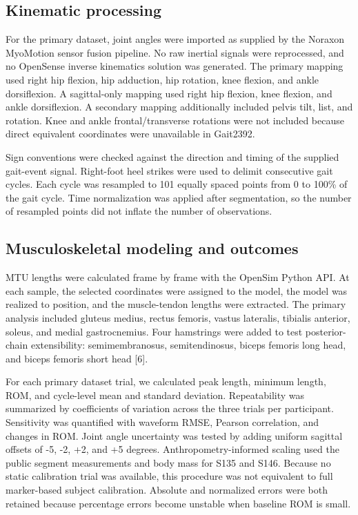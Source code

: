 \documentclass[11pt]{article}
\begin{document}
\subsection{Kinematic processing}

For the primary dataset, joint angles were imported as supplied by the Noraxon MyoMotion sensor fusion pipeline. No raw inertial signals were reprocessed, and no OpenSense inverse kinematics solution was generated. The primary mapping used right hip flexion, hip adduction, hip rotation, knee flexion, and ankle dorsiflexion. A sagittal-only mapping used right hip flexion, knee flexion, and ankle dorsiflexion. A secondary mapping additionally included pelvis tilt, list, and rotation. Knee and ankle frontal/transverse rotations were not included because direct equivalent coordinates were unavailable in Gait2392.

Sign conventions were checked against the direction and timing of the supplied gait-event signal. Right-foot heel strikes were used to delimit consecutive gait cycles. Each cycle was resampled to 101 equally spaced points from 0 to 100\% of the gait cycle. Time normalization was applied after segmentation, so the number of resampled points did not inflate the number of observations.

\subsection{Musculoskeletal modeling and outcomes}

MTU lengths were calculated frame by frame with the OpenSim Python API. At each sample, the selected coordinates were assigned to the model, the model was realized to position, and the muscle-tendon lengths were extracted. The primary analysis included gluteus medius, rectus femoris, vastus lateralis, tibialis anterior, soleus, and medial gastrocnemius. Four hamstrings were added to test posterior-chain extensibility: semimembranosus, semitendinosus, biceps femoris long head, and biceps femoris short head [6].

For each primary dataset trial, we calculated peak length, minimum length, ROM, and cycle-level mean and standard deviation. Repeatability was summarized by coefficients of variation across the three trials per participant. Sensitivity was quantified with waveform RMSE, Pearson correlation, and changes in ROM. Joint angle uncertainty was tested by adding uniform sagittal offsets of -5, -2, +2, and +5 degrees. Anthropometry-informed scaling used the public segment measurements and body mass for S135 and S146. Because no static calibration trial was available, this procedure was not equivalent to full marker-based subject calibration. Absolute and normalized errors were both retained because percentage errors become unstable when baseline ROM is small.
\end{document}
